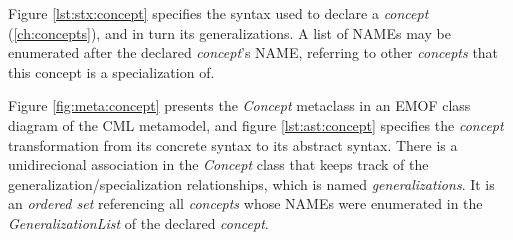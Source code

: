 Figure \ref{lst:stx:concept} specifies the syntax used
to declare a \emph{concept} (\ref{ch:concepts}),
and in turn its generalizations.
A list of NAMEs may be enumerated after the declared \emph{concept}'s NAME,
referring to other \emph{concepts} that this concept is a specialization of.

Figure \ref{fig:meta:concept} presents the \emph{Concept} metaclass
in an EMOF \cite{mof} class diagram of the CML metamodel,
and figure \ref{lst:ast:concept} specifies
the \emph{concept} transformation
from its concrete syntax to its abstract syntax.
There is a unidirecional association in the \emph{Concept} class
that keeps track of the generalization/specialization relationships,
which is named \emph{generalizations}.
It is an \emph{ordered set} referencing all \emph{concepts}
whose NAMEs were enumerated in the \emph{GeneralizationList}
of the declared \emph{concept}.
